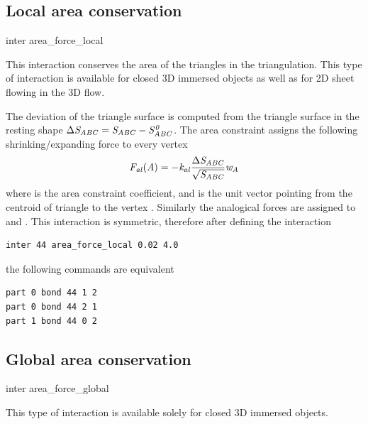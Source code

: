 \subsection{Local area conservation}

\begin{essyntax}
  inter 
  area_force_local
   
\end{essyntax}
This interaction conserves the area of the triangles in the triangulation. This 
type of interaction is available for closed 3D immersed objects as well as for 2D 
sheet flowing in the 3D flow.

The deviation of the triangle surface  is computed from the triangle 
surface in the resting shape $\Delta \var{S_{ABC}} = \var{S_{ABC}} - \var{S_{ABC}^0}$. 
The area constraint assigns the following shrinking/expanding force to every vertex 
\begin{equation}
 \var{F_{al}(A)} = -\var{k_{al}}\frac{\Delta \var{S_{ABC}}}{\var{\sqrt{S_{ABC}}}}\var{w_{A}}
\end{equation}
where   is the area constraint coefficient, and  is the unit 
vector pointing from the centroid of triangle  to the vertex . 
Similarly the analogical forces are assigned to  and . This interaction 
is symmetric, therefore after defining the interaction
\begin{verbatim} 
inter 44 area_force_local 0.02 4.0
\end{verbatim}
the following commands are equivalent
\begin{verbatim} 
part 0 bond 44 1 2
part 0 bond 44 2 1
part 1 bond 44 0 2
\end{verbatim}

\subsection{Global area conservation}

\begin{essyntax}
  inter 
  area_force_global
   
\end{essyntax}
This type of interaction is available solely for closed 3D immersed objects.

